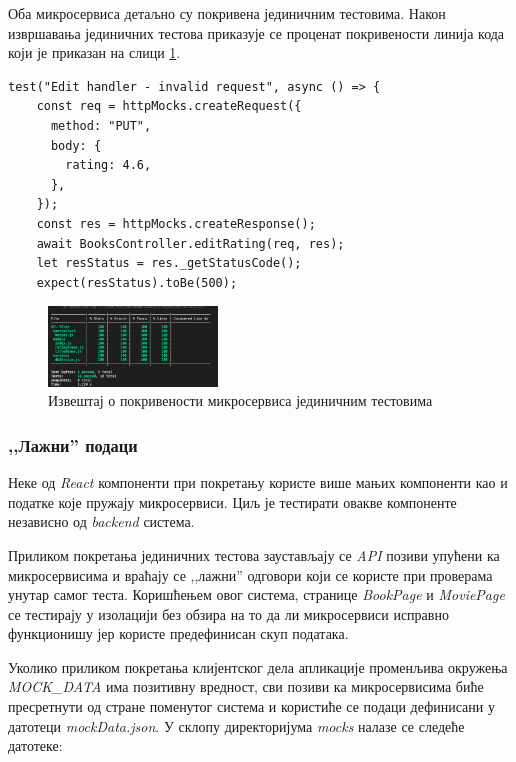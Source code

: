 \documentclass[12pt,oneside]{memoir}
\begin{document}
Оба микросервиса детаљно су покривена јединичним тестовима. Након извршавања јединичних тестова приказује се проценат покривености линија кода који је приказан на слици \ref{fig:pokrivenost}.

\begin{lstlisting}[caption=Јединично тестирање контролера за измену оцене књиге --- неисправан улаз,
label={lst:testController},
frame=single]
test("Edit handler - invalid request", async () => {
    const req = httpMocks.createRequest({
      method: "PUT",
      body: {
        rating: 4.6,
      },
    });
    const res = httpMocks.createResponse();
    await BooksController.editRating(req, res);
    let resStatus = res._getStatusCode();
    expect(resStatus).toBe(500);
\end{lstlisting}



\begin{figure}[!ht]
  \centering
  \includegraphics[width=0.4\textwidth]{matfmaster/img/coverage.png}
  \caption{Извештај о покривености микросервиса јединичним тестовима}
  \label{fig:pokrivenost}
\end{figure}


\subsubsection{,,Лажни” подаци}

Неке од \textit{React} компоненти при покретању користе више мањих компоненти као и податке које пружају микросервиси. Циљ је тестирати овакве компоненте независно од \textit{backend} система.

Приликом покретања јединичних тестова заустављају се \textit{API} позиви упућени ка микросервисима и враћају се ,,лажни” одговори који се користе при проверама унутар самог теста.  Коришћењем овог система, странице \textit{BookPage} и \textit{MoviePage} се тестирају  у изолацији без обзира на то да ли микросервиси исправно функционишу јер користе предефинисан скуп података.

Уколико приликом покретања клијентског дела апликације променљива окружења \textit{MOCK\_DATA} има позитивну вредност, сви позиви ка микросервисима биће пресретнути од стране поменутог система и користиће се подаци дефинисани у датотеци \textit{mockData.json}. У склопу директоријума \textit{mocks} налазе се следеће датотеке:
\end{document}
